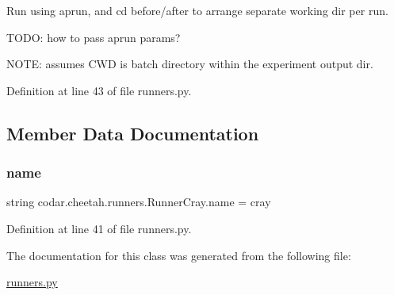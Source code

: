 \begin{DoxyVerb}Run using aprun, and cd before/after to arrange separate working
dir per run.

TODO: how to pass aprun params?

NOTE: assumes CWD is batch directory within the experiment output dir.
\end{DoxyVerb}
 

Definition at line 43 of file runners.\+py.



\subsection{Member Data Documentation}
\mbox{\label{classcodar_1_1cheetah_1_1runners_1_1_runner_cray_af39659e3752a349dcac224089a410a0f}} 
\subsubsection{\texorpdfstring{name}{name}}
{\footnotesize\ttfamily string codar.\+cheetah.\+runners.\+Runner\+Cray.\+name = \textquotesingle{}cray\textquotesingle{}\hspace{0.3cm}{\ttfamily [static]}}



Definition at line 41 of file runners.\+py.



The documentation for this class was generated from the following file\+:\begin{DoxyCompactItemize}
\item 
\hyperlink{runners_8py}{runners.\+py}\end{DoxyCompactItemize}
